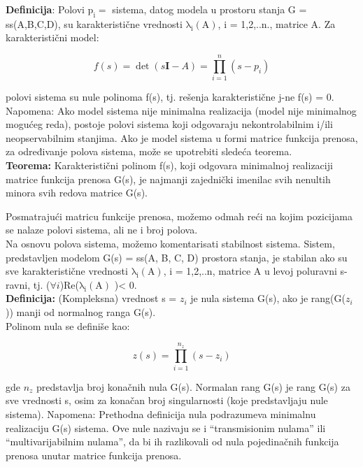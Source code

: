 \documentclass[a4paper,11pt]{article}
\theoremstyle{definition} \newtheorem{deff}{Definicija}[section]
\theoremstyle{definition} \newtheorem{prim}[deff]{Primer}
\theoremstyle{plain} \newtheorem{teor}[deff]{Teorema}
\begin{document}
	\textbf{Definicija}: Polovi $\mathrm{p_i} = $ sistema, datog modela u prostoru stanja G = ss(A,B,C,D), su karakteristične vrednosti $\mathrm{\lambda_i(A)} $, i = 1,2,..n., matrice A. 
	Za karakteristični model:
	
	\begin{equation}
		f(s) = \det(s\mathbf{I}-A) = \prod_{i=1}^{n} (s - p_i)
	\end{equation}
	
	
	\noindent polovi sistema su nule polinoma f(s), tj. rešenja karakteristične j-ne f(s) = 0.
	Napomena: Ako model sistema nije minimalna realizacija (model nije minimalnog mogućeg reda), postoje polovi sistema koji odgovaraju nekontrolabilnim i/ili neopservabilnim stanjima.
	Ako je model sistema u formi matrice funkcija prenosa, za određivanje polova sistema, može se upotrebiti sledeća teorema. \\
	
	\textbf{Teorema:} Karakteristični polinom f(s), koji odgovara minimalnoj realizaciji matrice funkcija prenosa G(s), je najmanji zajednički imenilac svih nenultih minora svih redova matrice G(s).
	
	Posmatrajući matricu funkcije prenosa, možemo odmah reći na kojim pozicijama se nalaze polovi sistema, ali ne i broj polova. \\
	
	Na osnovu polova sistema, možemo komentarisati stabilnost sistema. Sistem, predstavljen modelom G(s) = ss(A, B, C, D) prostora stanja, je stabilan ako su sve karakteristične vrednosti $\mathrm{\lambda_i(A)} $, i = 1,2,..n, 
	matrice A u levoj poluravni s-ravni, tj. ($\forall i$)Re($\mathrm{\lambda_i(A)} $ )< 0. \\
	
	\textbf{Definicija:} (Kompleksna) vrednost s = $z_i$ je nula sistema G(s), ako je rang(G($z_i$)) manji od normalnog ranga G(s).\\
	
	Polinom nula se definiše kao: 
	
	\begin{equation}
		z(s) =  \prod_{i=1}^{n_z} (s - z_i)
	\end{equation}
	
	\noindent gde $n_z$ predstavlja broj konačnih nula G(s).
	Normalan rang G(s) je rang G(s) za sve vrednosti s, osim za konačan broj singularnosti (koje predstavljaju nule sistema).
	Napomena: Prethodna definicija nula podrazumeva minimalnu realizaciju G(s) sistema. Ove nule nazivaju se i “transmisionim nulama” ili “multivarijabilnim nulama”, da bi ih razlikovali od nula pojedinačnih funkcija prenosa unutar matrice funkcija prenosa.\\
	
\end{document}
